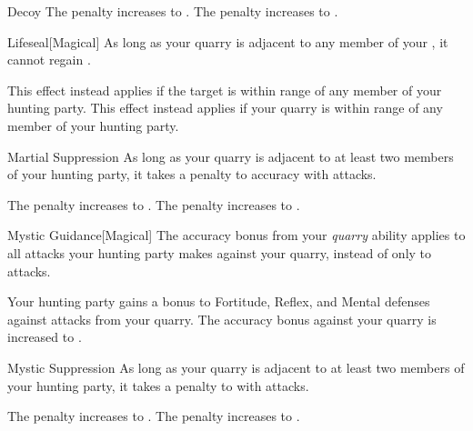 {\begin{freeability}{Decoy}
                \rankline
                 The penalty increases to .
                 The penalty increases to .
            \end{freeability}

            \begin{freeability}{Lifeseal}[Magical]
                As long as your quarry is adjacent to any member of your , it cannot regain .

                \rankline
                 This effect instead applies if the target is within \rngmed range of any member of your hunting party.
                 This effect instead applies if your quarry is within \rngdist range of any member of your hunting party.
            \end{freeability}

            \begin{freeability}{Martial Suppression}
                As long as your quarry is adjacent to at least two members of your hunting party, it takes a  penalty to accuracy with  attacks.

                \rankline
                 The penalty increases to .
                 The penalty increases to .
            \end{freeability}

            \begin{freeability}{Mystic Guidance}[Magical]
                The accuracy bonus from your \textit{quarry} ability applies to all attacks your hunting party makes against your quarry, instead of only to  attacks.

                \rankline
                 Your hunting party gains a  bonus to Fortitude, Reflex, and Mental defenses against attacks from your quarry.
                 The accuracy bonus against your quarry is increased to .
            \end{freeability}

            \begin{freeability}{Mystic Suppression}
                As long as your quarry is adjacent to at least two members of your hunting party, it takes a  penalty to  with  attacks.

                \rankline
                 The penalty increases to . 
                 The penalty increases to .
            \end{freeability}

}
